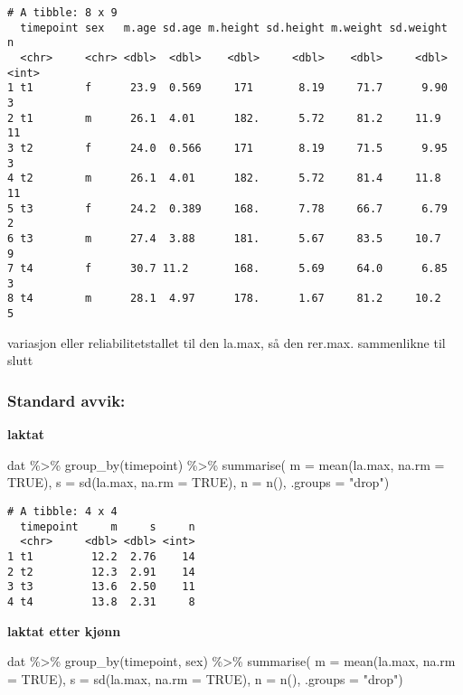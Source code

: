 \documentclass[
  letterpaper,
  DIV=11,
  numbers=noendperiod]{scrreprt}
\newenvironment{Shaded}{\begin{snugshade}}{\end{snugshade}}
\newcommand{\AttributeTok}[1]{\textcolor[rgb]{0.40,0.45,0.13}{#1}}
\newcommand{\ConstantTok}[1]{\textcolor[rgb]{0.56,0.35,0.01}{#1}}
\newcommand{\FunctionTok}[1]{\textcolor[rgb]{0.28,0.35,0.67}{#1}}
\newcommand{\NormalTok}[1]{\textcolor[rgb]{0.00,0.23,0.31}{#1}}
\newcommand{\SpecialCharTok}[1]{\textcolor[rgb]{0.37,0.37,0.37}{#1}}
\newcommand{\StringTok}[1]{\textcolor[rgb]{0.13,0.47,0.30}{#1}}
\begin{document}
\begin{verbatim}
# A tibble: 8 x 9
  timepoint sex   m.age sd.age m.height sd.height m.weight sd.weight     n
  <chr>     <chr> <dbl>  <dbl>    <dbl>     <dbl>    <dbl>     <dbl> <int>
1 t1        f      23.9  0.569     171       8.19     71.7      9.90     3
2 t1        m      26.1  4.01      182.      5.72     81.2     11.9     11
3 t2        f      24.0  0.566     171       8.19     71.5      9.95     3
4 t2        m      26.1  4.01      182.      5.72     81.4     11.8     11
5 t3        f      24.2  0.389     168.      7.78     66.7      6.79     2
6 t3        m      27.4  3.88      181.      5.67     83.5     10.7      9
7 t4        f      30.7 11.2       168.      5.69     64.0      6.85     3
8 t4        m      28.1  4.97      178.      1.67     81.2     10.2      5
\end{verbatim}

variasjon eller reliabilitetstallet til den la.max, så den rer.max.
sammenlikne til slutt

\subsubsection{Standard avvik:}\label{standard-avvik}

\textbf{laktat}

\begin{Shaded}
\begin{Highlighting}[]
\NormalTok{dat }\SpecialCharTok{\%\textgreater{}\%}
  \FunctionTok{group\_by}\NormalTok{(timepoint) }\SpecialCharTok{\%\textgreater{}\%}
  \FunctionTok{summarise}\NormalTok{(}
    \AttributeTok{m =} \FunctionTok{mean}\NormalTok{(la.max, }\AttributeTok{na.rm =} \ConstantTok{TRUE}\NormalTok{),}
    \AttributeTok{s =} \FunctionTok{sd}\NormalTok{(la.max, }\AttributeTok{na.rm =} \ConstantTok{TRUE}\NormalTok{),}
     \AttributeTok{n =} \FunctionTok{n}\NormalTok{(),}
    \AttributeTok{.groups =} \StringTok{"drop"}\NormalTok{)}
\end{Highlighting}
\end{Shaded}

\begin{verbatim}
# A tibble: 4 x 4
  timepoint     m     s     n
  <chr>     <dbl> <dbl> <int>
1 t1         12.2  2.76    14
2 t2         12.3  2.91    14
3 t3         13.6  2.50    11
4 t4         13.8  2.31     8
\end{verbatim}

\textbf{laktat etter kjønn}

\begin{Shaded}
\begin{Highlighting}[]
\NormalTok{dat }\SpecialCharTok{\%\textgreater{}\%}
  \FunctionTok{group\_by}\NormalTok{(timepoint, sex) }\SpecialCharTok{\%\textgreater{}\%}
  \FunctionTok{summarise}\NormalTok{(}
    \AttributeTok{m =} \FunctionTok{mean}\NormalTok{(la.max, }\AttributeTok{na.rm =} \ConstantTok{TRUE}\NormalTok{),}
    \AttributeTok{s =} \FunctionTok{sd}\NormalTok{(la.max, }\AttributeTok{na.rm =} \ConstantTok{TRUE}\NormalTok{),}
     \AttributeTok{n =} \FunctionTok{n}\NormalTok{(),}
    \AttributeTok{.groups =} \StringTok{"drop"}\NormalTok{)}
\end{Highlighting}
\end{Shaded}
\end{document}
